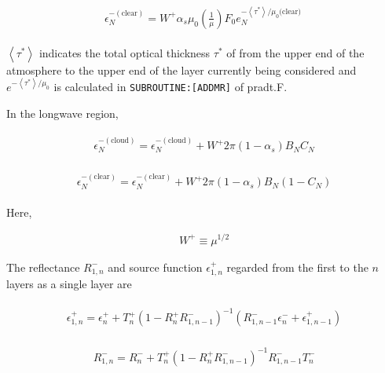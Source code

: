 \begin{eqnarray}
\begin{array}{l}
\epsilon_{N}^{-(\text {clear})}=W^{+} \alpha_{s} \mu_{0}\left(\frac{1}{\mu}\right) F_{0} e_{N}^{-\left\langle\tau^{*}\right\rangle / \mu_{0} \text {(clear) }}
\end{array}
\end{eqnarray}

\(\left\langle\tau^{*}\right\rangle\) indicates the total optical
thickness \(\tau^{*}\) of from the upper end of the atmosphere to the
upper end of the layer currently being considered and
\(e^{-\left\langle\tau^{*}\right\rangle / \mu_{0}}\) is calculated in
\texttt{SUBROUTINE:{[}ADDMR{]}} of pradt.F.

In the longwave region,

\begin{eqnarray}
\begin{array}{l}
\epsilon_{N}^{-(\text {cloud})}=\epsilon_{N}^{-(\text {cloud})}+W^{+} 2 \pi\left(1-\alpha_{s}\right) B_{N} C_{N}
\end{array}
\end{eqnarray}

\begin{eqnarray}
\begin{array}{l}
\epsilon_{N}^{-(\text {clear})}=\epsilon_{N}^{-(\text {clear})}+W^{+} 2 \pi\left(1-\alpha_{s}\right) B_{N}\left(1-C_{N}\right)
\end{array}
\end{eqnarray}

Here,

\begin{eqnarray}
W^{+} \equiv \mu^{1 / 2}
\end{eqnarray}

The reflectance \(R_{1, n}^{-}\) and source function
\(\epsilon_{1, n}^{+}\) regarded from the first to the \(n\) layers as a
single layer are

\begin{eqnarray}
\begin{array}{l}
\epsilon_{1, n}^{+}=\epsilon_{n}^{+}+T_{n}^{+}\left(1-R_{n}^{+} R_{1, n-1}^{-}\right)^{-1}\left(R_{1, n-1}^{-} \epsilon_{n}^{-}+\epsilon_{1, n-1}^{+}\right)
\end{array}
\end{eqnarray}

\begin{eqnarray}
\begin{array}{l}
R_{1, n}^{-}=R_{n}^{-}+T_{n}^{+}\left(1-R_{n}^{+} R_{1, n-1}^{-}\right)^{-1} R_{1, n-1}^{-} T_{n}^{-}
\end{array}
\end{eqnarray}

